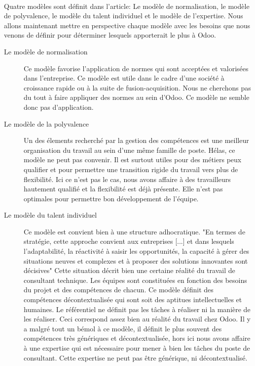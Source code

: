 \paragraph{}Quatre modèles sont définit dans l'article\citep[pp.39-49]{delobbe}: Le modèle de normalisation, le modèle de polyvalence, le modèle du talent individuel et le modèle de l'expertise. Nous allons maintenant mettre en perspective chaque modèle avec les besoins que nous venons de définir pour déterminer lesquels apporterait le plus à Odoo.
\begin{description}
  \item[Le modèle de normalisation]
  Ce modèle favorise l'application de normes qui sont acceptées et valorisées dans l'entreprise. Ce modèle est utile dans le cadre d'une société à croissance rapide ou à la suite de fusion-acquisition. Nous ne cherchons pas du tout à faire appliquer des normes au sein d'Odoo. Ce modèle ne semble donc pas d'application. 
  \item[Le modèle de la polyvalence]
  Un des élements recherché par la gestion des compétences est une meilleur organisation du travail au sein d'une même famille de poste. Hélas, ce modèle ne peut pas convenir. Il est surtout utiles pour des métiers peux qualifier et pour permettre une transition rigide du travail vers plus de flexibilité. Ici ce n'est pas le cas, nous avons affaire à des travailleurs hautement qualifié et la flexibilité est déjà présente. Elle n'est pas optimales pour permettre bon développement de l'équipe. 
  \item[Le modèle du talent individuel]
  Ce modèle est convient bien à une structure adhocratique. "En termes de stratégie, cette approche convient aux entreprises [...] et dans lesquels l'adaptabilité, la réactivité à saisir les opportunités, la capacité à gérer des situations neuves et complexes et à proposer des solutions innovantes sont décisives"\citep[pp.44]{delobbe} Cette situation décrit bien une certaine réalité du travail de consultant technique. Les équipes sont constituées en fonction des besoins du projet et des compétences de chacun. Ce modèle définit des compétences décontextualisée qui sont soit des aptitues intellectuelles et humaines. Le référentiel ne définit pas les tâches à réaliser ni la manière de les réaliser. Ceci correspond assez bien au réalité du travail chez Odoo. Il y a malgré tout un bémol à ce modèle, il définit le plus souvent des compétences très génériques et décontextualisée, hors ici nous avons affaire à une expertise qui est nécessaire pour mener à bien les tâches du poste de consultant. Cette expertise ne peut pas être générique, ni décontextualisé. 

\end{description}
